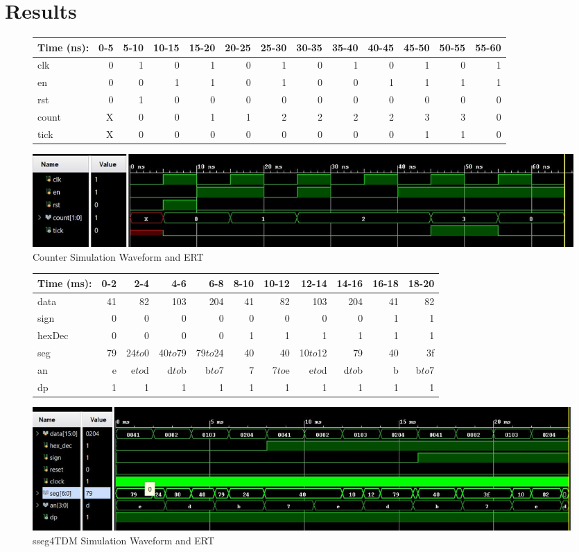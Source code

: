 \documentclass[11pt]{article}
\begin{document}
\section*{Results}

\begin{figure}[ht]\centering
	
	\begin{tabular}{l|rrrrrrrrrrrr}	
		Time (ns): & 0-5 & 5-10 & 10-15 & 15-20 & 20-25 & 25-30 & 30-35 & 35-40 & 40-45 & 45-50 & 50-55 & 55-60 \\
		\midrule
		clk     & 0 & 1 & 0 & 1 & 0 & 1 & 0 & 1 & 0 & 1 & 0 & 1\\
		en  	& 0 & 0 & 1 & 1 & 0 & 1 & 0 & 0 & 1 & 1 & 1 & 1\\
		rst 	& 0 & 1 & 0 & 0 & 0	& 0 & 0 & 0 & 0	& 0 & 0 & 0\\
		\midrule
		count 	& X & 0 & 0 & 1 & 1 & 2 & 2	& 2 & 2 & 3 & 3 & 0 \\
		tick	& X & 0 & 0 & 0 & 0 & 0 & 0	& 0 & 0 & 1 & 1 & 0 \\
		\bottomrule
	\end{tabular}
	\bigskip
	\includegraphics[width=1\textwidth,angle=0,origin=c]{counterWaveform}
	\caption{Counter Simulation Waveform and ERT}
	\label{fig:sim_with_table}
\end{figure}

\begin{figure}[ht]\centering
	
	\begin{tabular}{l|rrrrrrrrrr}
		Time (ms): & 0-2 & 2-4 & 4-6 & 6-8 & 8-10 & 10-12 & 12-14 & 14-16 & 16-18 & 18-20\\
		\midrule
		data  & 41 & 82 & 103      & 204 & 41 & 	  82 & 103 & 	   204 & 41 & 82 \\
		sign  & 0 & 0 & 0      & 0 & 0 &   	  0 & 0 & 	   0 & 1 & 1 \\
		hexDec & 0& 0 & 0      & 0 & 1 &      1 & 1 &      1 & 1 & 1 \\ 
		\midrule
		seg   & 79 & 24$to$0 & 40$to$79 & 79$to$24 & 40 & 40 & 10$to$12 & 79 & 40 & 3f \\
		an    & e  & e$to$d & d$to$b & b$to$7 & 7 & 7$to$e & e$to$d & d$to$b & b & b$to$7 \\
		dp    & 1  & 1      & 1      & 1      & 1 &      1 & 1      & 1      & 1 & 1      \\ 
		\bottomrule
	\end{tabular}
	\bigskip
	\includegraphics[width=1\textwidth,angle=0,origin=c]{sseg4tdmWaveform}
	\caption{sseg4TDM Simulation Waveform and ERT}
	\label{fig:sim_with_table}
\end{figure}
\end{document}
